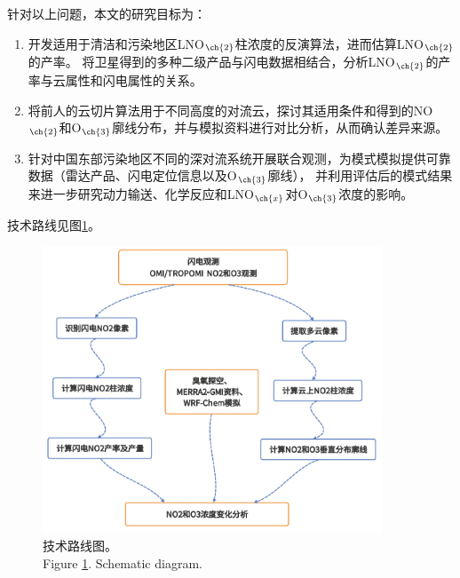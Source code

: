 针对以上问题，本文的研究目标为：

\begin{enumerate}[label=（\arabic*）, labelindent=\parindent, nosep, leftmargin=0pt, widest=0, itemindent=*, topsep=0pt, partopsep=0pt, parsep=0pt]

\item 开发适用于清洁和污染地区LNO$_{\ch{2}}$柱浓度的反演算法，进而估算LNO$_{\ch{2}}$的产率。
将卫星得到的多种二级产品与闪电数据相结合，分析LNO$_{\ch{2}}$的产率与云属性和闪电属性的关系。

\item 将前人的云切片算法用于不同高度的对流云，探讨其适用条件和得到的NO$_{\ch{2}}$和O$_{\ch{3}}$廓线分布，并与模拟资料进行对比分析，从而确认差异来源。

\item 针对中国东部污染地区不同的深对流系统开展联合观测，为模式模拟提供可靠数据（雷达产品、闪电定位信息以及O$_{\ch{3}}$廓线），
并利用评估后的模式结果来进一步研究动力输送、化学反应和LNO$_{\ch{x}}$对O$_{\ch{3}}$浓度的影响。

\end{enumerate}


技术路线见图\ref{figure:schematic_diagram}。

\begin{figure}[H]
\centering
\includegraphics[width=0.9\textwidth]{./figures/schematic_diagram.png}
\caption{技术路线图。\\
Figure \ref{figure:schematic_diagram}. Schematic diagram.
}
\label{figure:schematic_diagram}
\end{figure}

